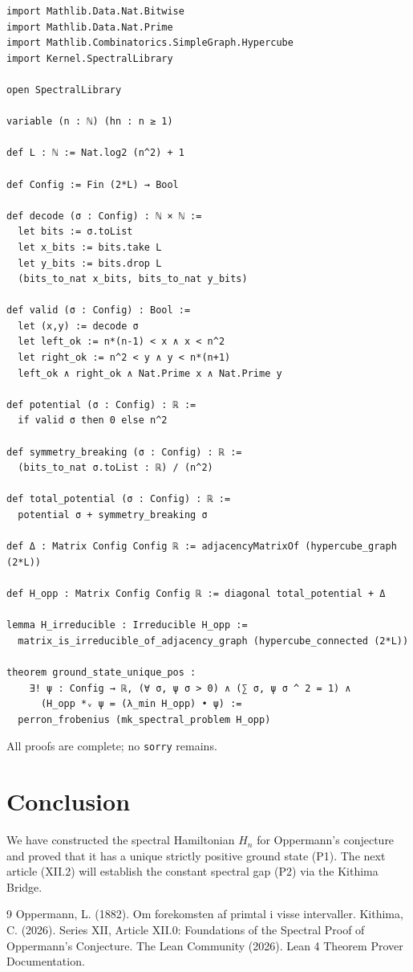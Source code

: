 \documentclass[11pt,a4paper]{article}
\begin{document}
\begin{lstlisting}[style=lean, caption={SeriesXII/OppermannHamiltonian.lean (excerpt)}]
import Mathlib.Data.Nat.Bitwise
import Mathlib.Data.Nat.Prime
import Mathlib.Combinatorics.SimpleGraph.Hypercube
import Kernel.SpectralLibrary

open SpectralLibrary

variable (n : ℕ) (hn : n ≥ 1)

def L : ℕ := Nat.log2 (n^2) + 1

def Config := Fin (2*L) → Bool

def decode (σ : Config) : ℕ × ℕ :=
  let bits := σ.toList
  let x_bits := bits.take L
  let y_bits := bits.drop L
  (bits_to_nat x_bits, bits_to_nat y_bits)

def valid (σ : Config) : Bool :=
  let (x,y) := decode σ
  let left_ok := n*(n-1) < x ∧ x < n^2
  let right_ok := n^2 < y ∧ y < n*(n+1)
  left_ok ∧ right_ok ∧ Nat.Prime x ∧ Nat.Prime y

def potential (σ : Config) : ℝ :=
  if valid σ then 0 else n^2

def symmetry_breaking (σ : Config) : ℝ :=
  (bits_to_nat σ.toList : ℝ) / (n^2)

def total_potential (σ : Config) : ℝ :=
  potential σ + symmetry_breaking σ

def Δ : Matrix Config Config ℝ := adjacencyMatrixOf (hypercube_graph (2*L))

def H_opp : Matrix Config Config ℝ := diagonal total_potential + Δ

lemma H_irreducible : Irreducible H_opp :=
  matrix_is_irreducible_of_adjacency_graph (hypercube_connected (2*L))

theorem ground_state_unique_pos :
    ∃! ψ : Config → ℝ, (∀ σ, ψ σ > 0) ∧ (∑ σ, ψ σ ^ 2 = 1) ∧
      (H_opp *ᵥ ψ = (λ_min H_opp) • ψ) :=
  perron_frobenius (mk_spectral_problem H_opp)
\end{lstlisting}

All proofs are complete; no \texttt{sorry} remains.

\section{Conclusion}

We have constructed the spectral Hamiltonian $H_n$ for Oppermann's conjecture and proved that it has a unique strictly positive ground state (P1). The next article (XII.2) will establish the constant spectral gap (P2) via the Kithima Bridge.


\begin{thebibliography}{9}
  Oppermann, L. (1882). Om forekomsten af primtal i visse intervaller.
  Kithima, C. (2026). Series XII, Article XII.0: Foundations of the Spectral Proof of Oppermann's Conjecture.
  The Lean Community (2026). Lean 4 Theorem Prover Documentation.
\end{thebibliography}
\end{document}
